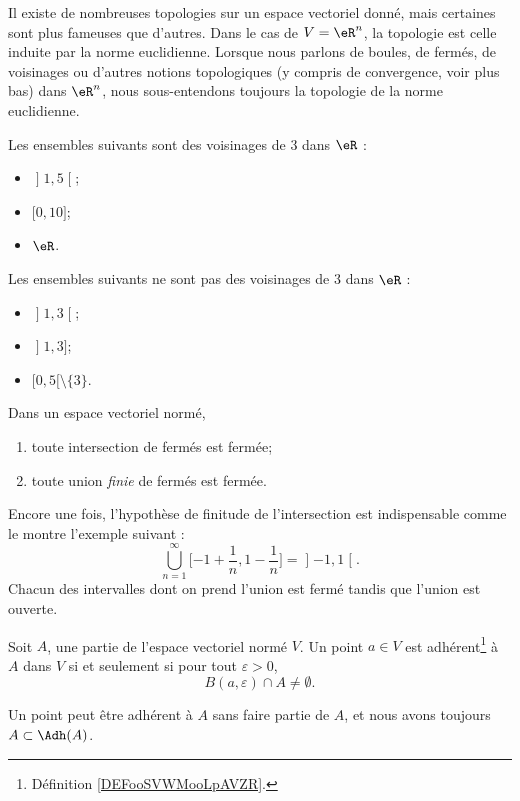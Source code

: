 Il existe de nombreuses topologies sur un espace vectoriel donné, mais certaines sont plus fameuses que d'autres. Dans le cas de $V=\eR^n$, la topologie  est celle induite par la norme euclidienne. Lorsque nous parlons de boules, de fermés, de voisinages ou d'autres notions topologiques (y compris de convergence, voir plus bas) dans $\eR^n$, nous sous-entendons toujours la topologie de la norme euclidienne.

\begin{example}
	Les ensembles suivants sont des voisinages de $3$ dans $\eR$ :
	\begin{itemize}
		\item
		      $\mathopen] 1 , 5 \mathclose[$;
		\item
		      $\mathopen[ 0 , 10 \mathclose]$;
		\item
		      $\eR$.
	\end{itemize}
	Les ensembles suivants ne sont pas des voisinages de $3$ dans $\eR$ :
	\begin{itemize}
		\item
		      $\mathopen] 1 , 3 \mathclose[$;
		\item
		      $\mathopen] 1 , 3 \mathclose]$;
		\item
		      $\mathopen[ 0 , 5 [\setminus\{ 3 \}$.
	\end{itemize}
\end{example}

\begin{proposition}
	Dans un espace vectoriel normé,
	\begin{enumerate}
		\item
		      toute intersection de fermés est fermée;
		\item
		      toute union \emph{finie} de fermés est fermée.
	\end{enumerate}
\end{proposition}
Encore une fois, l'hypothèse de finitude de l'intersection est indispensable comme le montre l'exemple suivant :
\begin{equation}
	\bigcup_{n=1}^{\infty}\mathopen[ -1+\frac{1}{ n } , 1-\frac{1}{ n } \mathclose]=\mathopen] -1 , 1 \mathclose[.
\end{equation}
Chacun des intervalles dont on prend l'union est fermé tandis que l'union est ouverte.

\begin{lemma}       \label{LEMooHPQTooHKdoiL}
	Soit $A$, une partie de l'espace vectoriel normé $V$. Un point $a\in V$ est adhérent\footnote{Définition \ref{DEFooSVWMooLpAVZR}.} à $A$ dans $V$ si et seulement si pour tout $\varepsilon>0$,
	\begin{equation}
		B(a,\varepsilon)\cap A\neq\emptyset.
	\end{equation}
\end{lemma}
Un point peut être adhérent à $A$ sans faire partie de $A$, et nous avons toujours $A\subset\Adh(A)$.

